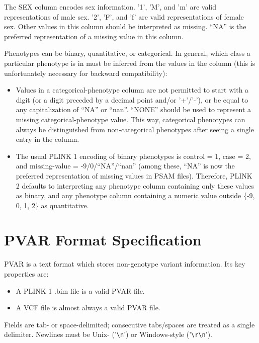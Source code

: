 \documentclass[8pt]{article}
\begin{document}
The SEX column encodes sex information.  '1', 'M', and 'm' are valid
representations of male sex.  '2', 'F', and 'f' are valid representations of
female sex.  Other values in this column should be interpreted as missing.
``NA'' is the preferred representation of a missing value in this column.

Phenotypes can be binary, quantitative, or categorical.  In general, which
class a particular phenotype is in must be inferred from the values in the
column (this is unfortunately necessary for backward compatibility):

\begin{itemize}
\item Values in a categorical-phenotype column are not permitted to start with
  a digit (or a digit preceded by a decimal point and/or '+'/'-'), or be equal
  to any capitalization of ``NA'' or ``nan''.  ``NONE'' should be used to
  represent a missing categorical-phenotype value.  This way, categorical
  phenotypes can always be distinguished from non-categorical phenotypes after
  seeing a single entry in the column.
\item The usual PLINK 1 encoding of binary phenotypes is control = 1, case = 2,
  and missing-value = -9/0/``NA''/``nan'' (among these, ``NA'' is now the
  preferred representation of missing values in PSAM files).  Therefore, PLINK
  2 defaults to interpreting any phenotype column containing only these values
  as binary, and any phenotype column containing a numeric value outside \{-9,
  0, 1, 2\} as quantitative.
\end{itemize}

\newpage
\section{PVAR Format Specification}

PVAR is a text format which stores non-genotype variant information.  Its key
properties are:

\begin{itemize}
\item A PLINK 1 .bim file is a valid PVAR file.
\item A VCF file is almost always a valid PVAR file.
\end{itemize}

Fields are tab- or space-delimited; consecutive tabs/spaces are treated as a
single delimiter.  Newlines must be Unix- ('\texttt{\textbackslash n}') or
Windows-style ('\texttt{\textbackslash r\textbackslash n}').
\end{document}
